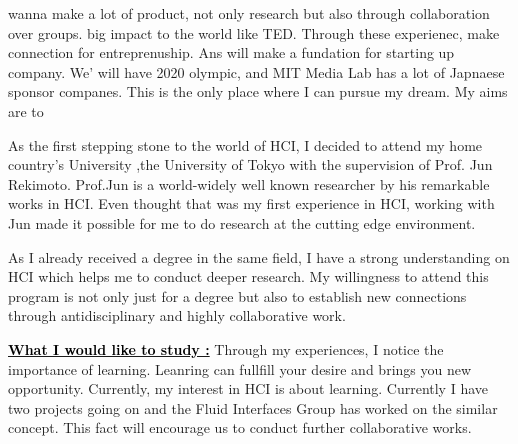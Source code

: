 \documentclass{article}
\newcommand{\statement}[1]{\par\medskip
  \underline{\textcolor{black}{\textbf{#1:}}}\space
}
\begin{document}
wanna make a lot of product, not only research but also through collaboration over groups. big impact to the world like TED. Through these experienec, make connection for entreprenuship. Ans will make a fundation for starting up company. We' will have 2020 olympic, and MIT Media Lab has a lot of Japnaese sponsor companes. This is the only place where I can pursue my dream.
My aims are to


As the first stepping stone to the world of HCI, I decided to attend my home country's University ,the University of Tokyo with the supervision of Prof. Jun Rekimoto. Prof.Jun is a world-widely well known researcher by his remarkable works in HCI. Even thought that was my first experience in HCI, working with Jun made it possible for me to do research at the cutting edge environment. 

As I already received a degree in the same field, I have a strong understanding on HCI which helps me to conduct deeper research. My willingness to attend this program is not only just for a degree but also to establish new connections through antidisciplinary and highly collaborative work.


\statement{What I would like to study } Through my experiences, I notice the importance of learning. Leanring can fullfill your desire and brings you new opportunity. Currently, my interest in HCI is about learning. Currently I have two projects going on and the Fluid Interfaces Group has worked on the similar concept. This fact will encourage us to conduct further collaborative works.
\end{document}
